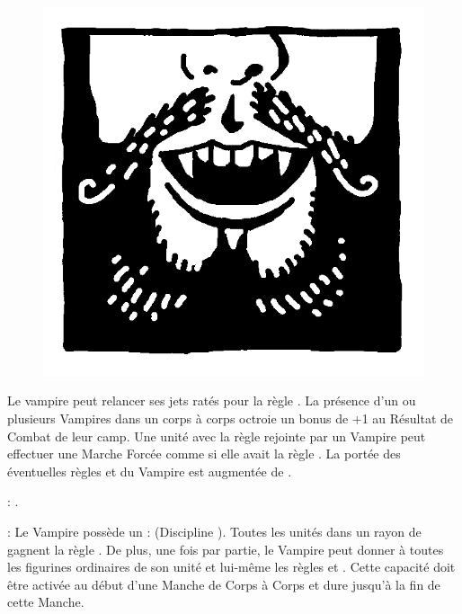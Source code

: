 \begin{figure}
\centering
\includegraphics[width=\logosize]{pics/logo_vonkarnstein.png}
\end{figure}
Le vampire peut relancer ses jets ratés pour la règle \vampiric{}. La présence d'un ou plusieurs Vampires \vonkarnstein{} dans un corps à corps octroie un bonus de +1 au Résultat de Combat de leur camp. Une unité avec la règle \undead{} rejointe par un Vampire \vonkarnstein{} peut effectuer une Marche Forcée comme si elle avait la règle \vampiric{}. La portée des éventuelles règles \inspiringpresence{} et \holdyourground{} du Vampire est augmentée de . 

\vspace{0.5cm}
\bloodties{} : \textbf{\darkcoach}.

\vspace{0.5cm}
\ancientbloodpower{} : \textbf{\stormcaller}\dotfill{}\newline%
Le Vampire possède un  : \heavensspelltwo{} (Discipline \heavens{}). Toutes les unités dans un rayon de  gagnent la règle \hardtarget{}. De plus, une fois par partie, le Vampire peut donner à toutes les figurines ordinaires de son unité et lui-même les règles \lightningattacks{} et \lightningreflexes{}. Cette capacité doit être activée au début d'une Manche de Corps à Corps et dure jusqu'à la fin de cette Manche.


